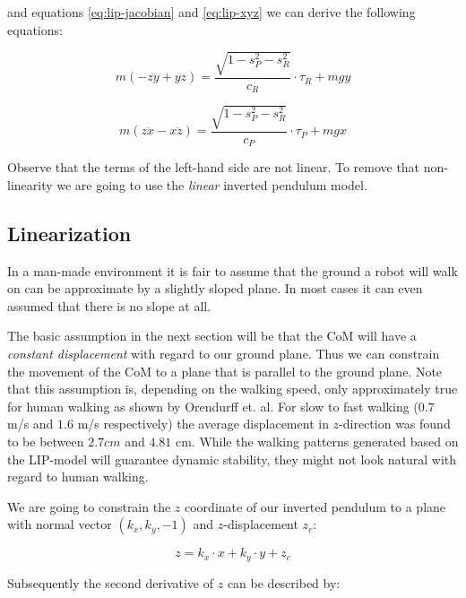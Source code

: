 \documentclass[english,ngerman]{KITreprt}
\newcommand{\clr}[2]{{\color{#1}{#2}}}
\newcommand{\todo}[1]{\marginpar{\clr{red}{#1}}}
\begin{document}
and equations \ref{eq:lip-jacobian} and \ref{eq:lip-xyz} we can derive
the following equations:

\begin{equation} \label{eq:lip-dyn-y}
m(-z\ddot{y} + y\ddot{z}) = \frac{\sqrt{1 - s_P^2 - s_R^2}}{c_R} \cdot \tau_R + m g y
\end{equation}

\begin{equation} \label{eq:lip-dyn-x}
m(z\ddot{x} - x\ddot{z}) = \frac{\sqrt{1 - s_P^2 - s_R^2}}{c_P} \cdot \tau_P + m g x
\end{equation}

Observe that the terms of the left-hand side are not linear. To remove
that non-linearity we are going to use the \emph{linear} inverted
pendulum model.

\subsection{Linearization}\label{linearization}

In a man-made environment it is fair to assume that the ground a robot
will walk on can be approximate by a slightly sloped plane. In most
cases it can even assumed that there is no slope at all.

The basic assumption in the next section will be that the CoM will have
a \emph{constant displacement} with regard to our ground plane. Thus we
can constrain the movement of the CoM to a plane that is parallel to the
ground plane. Note that this assumption is, depending on the walking
speed, only approximately true for human walking as shown by Orendurff
et. al. For slow to fast walking ($0.7$ m/s and $1.6$ m/s respectively)
the average displacement in $z$-direction was found to be between
$2.7cm$ and $4.81$ cm. While the walking patterns generated based on the
LIP-model will guarantee dynamic stability, they might not look natural
with regard to human walking.

\todo{cite Orendurff}

We are going to constrain the $z$ coordinate of our inverted pendulum to
a plane with normal vector $(k_x, k_y, -1)$ and $z$-displacement $z_c$:

\begin{equation} \label{eq:lip-z-plane}
z = k_x \cdot x + k_y \cdot y + z_c
\end{equation}

Subsequently the second derivative of $z$ can be described by:
\end{document}
